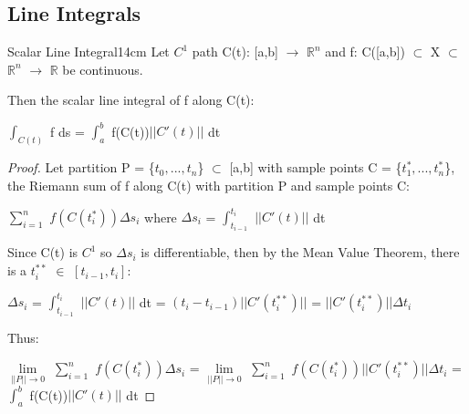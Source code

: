     \vspace{0.5cm}





\subsection{ Line Integrals }

    \begin{wtheorem}{Scalar Line Integral}{14cm}
        Let $C^1$ path C(t): [a,b] $\rightarrow$ $\mathbb{R}^n$
        and f: C([a,b]) $\subset$ X $\subset$ $\mathbb{R}^n$ $\rightarrow$
        $\mathbb{R}$ be continuous.

        Then the {\color{lblue} scalar line integral}
        of f along C(t):

        \hspace{0.5cm}
        $\int_{C(t)}$ f ds = $\int_a^b$ f(C(t))$|| C'(t) ||$ dt
    \end{wtheorem}

    \begin{proof}
        Let partition P = \{$t_0,...,t_n$\} $\subset$ [a,b]
        with sample points C = \{$t_1^*,...,t_n^*$\},
        the Riemann sum of f along C(t) with partition P and sample points C:

        \hspace{0.5cm}
        $\sum_{i=1}^n$ $f(C(t_i^*)) \Delta s_i$
        \hspace{1cm}
        where $\Delta s_i$ = $\int_{t_{i-1}}^{t_i}$ $||C'(t)||$ dt

        Since C(t) is $C^1$ so $\Delta s_i$ is differentiable, then
        by the Mean Value Theorem, there is a $t_i^{**}$ $\in$ $[t_{i-1},t_i]$:

        \hspace{0.5cm}
        $\Delta s_i$ = $\int_{t_{i-1}}^{t_i}$ $||C'(t)||$ dt
        = $(t_i - t_{i-1})||C'(t_i^{**})||$
        = $||C'(t_i^{**})|| \Delta t_i$

        Thus:

        $\underset{||P|| \rightarrow 0}{\lim}$
            $\sum_{i=1}^n$ $f(C(t_i^*)) \Delta s_i$
        = $\underset{||P|| \rightarrow 0}{\lim}$
            $\sum_{i=1}^n$ $f(C(t_i^*)) ||C'(t_i^{**})|| \Delta t_i$
        = $\int_a^b$ f(C(t))$|| C'(t) ||$ dt
    \end{proof}

    \newpage





